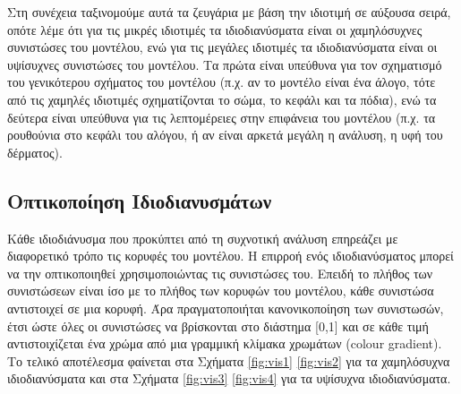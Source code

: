 \documentclass[draft]{article}
\begin{document}
Στη συνέχεια ταξινομούμε αυτά τα ζευγάρια με βάση την ιδιοτιμή σε αύξουσα σειρά,
οπότε λέμε ότι για τις μικρές ιδιοτιμές τα ιδιοδιανύσματα είναι οι χαμηλόσυχνες
συνιστώσες του μοντέλου,
ενώ για τις μεγάλες ιδιοτιμές τα ιδιοδιανύσματα είναι οι υψίσυχνες συνιστώσες του μοντέλου.
Τα πρώτα είναι υπεύθυνα για τον σχηματισμό του γενικότερου σχήματος του μοντέλου
(π.χ. αν το μοντέλο είναι ένα άλογο, τότε από τις χαμηλές ιδιοτιμές σχηματίζονται το
σώμα, το κεφάλι και τα πόδια), ενώ τα δεύτερα είναι υπεύθυνα για τις λεπτομέρειες στην
επιφάνεια του μοντέλου (π.χ. τα ρουθούνια στο κεφάλι του αλόγου,
ή αν είναι αρκετά μεγάλη η ανάλυση, η υφή του δέρματος).

\subsection{Οπτικοποίηση Ιδιοδιανυσμάτων}
Κάθε ιδιοδιάνυσμα που προκύπτει από τη συχνοτική ανάλυση επηρεάζει με διαφορετικό τρόπο
τις κορυφές του μοντέλου. Η επιρροή ενός ιδιοδιανύσματος μπορεί να την οπτικοποιηθεί
χρησιμοποιώντας τις συνιστώσες του. Επειδή το πλήθος των συνιστώσεων είναι ίσο με το
πλήθος των κορυφών του μοντέλου, κάθε συνιστώσα αντιστοιχεί σε μια κορυφή.
Άρα πραγματοποιήται κανονικοποίηση των συνιστωσών, έτσι ώστε όλες οι συνιστώσες να
βρίσκονται στο διάστημα [0,1] και σε κάθε τιμή αντιστοιχίζεται ένα χρώμα
από μια γραμμική κλίμακα χρωμάτων (colour gradient). Το τελικό αποτέλεσμα φαίνεται στα
Σχήματα \ref{fig:vis1} \ref{fig:vis2} για τα χαμηλόσυχνα ιδιοδιανύσματα και στα Σχήματα
\ref{fig:vis3} \ref{fig:vis4} για τα υψίσυχνα ιδιοδιανύσματα.
\end{document}
